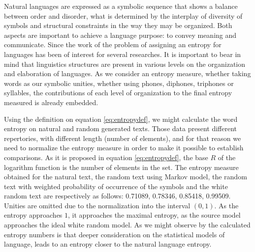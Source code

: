 Natural languages are expressed as a symbolic sequence that shows a balance between
order and disorder, what is determined by the interplay of diversity of symbols
and structural constraints in the way they may be organized. Both aspects
are important to achieve a language purpose: to convey meaning and communicate.
Since the work of \cite{shannon1948} the problem of assigning an entropy for languages
has been of interest for several researches. It is important to bear in mind that
linguistics structures are present in various levels on the organization and
elaboration of languages. As we consider an entropy measure, whether taking 
words as our symbolic unities, whether using phones, diphones, triphones or syllables,
the contributions of each level of organization to 
the final entropy measured is already embedded.

Using the definition on equation \ref{eq:entropydef}, we might calculate the word entropy
on natural and random generated texts. Those data present different repertories, with
different length (number of elements), and for that reason we need to normalize the
entropy measure in order to make it possible to establish comparisons. As it is
proposed in equation \ref{eq:entropydef}, the base $R$ of the logarithm function is
the number of elements in the set. The entropy measure obtained for the natural text,
the random text using Markov model, the random text with weighted probability of 
occurrence of the symbols and the white random text are respectively as follows:
0.71089, 0.78346, 0.85418, 0.99509. Unities are omitted due to the normalization
into the interval $(0,1)$. As the entropy approaches $1$, it approaches the maximal
entropy, as the source model approaches the ideal white random model. As we might
observe by the calculated entropy numbers is that deeper consideration on the 
statistical models of language, leads to an entropy closer to the natural language entropy.


